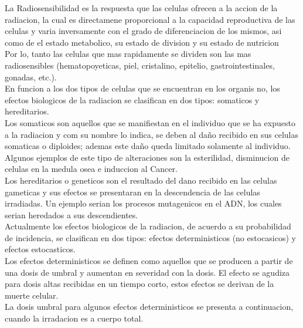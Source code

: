 \documentclass[11pt, oneside]{book}
\begin{document}
La Radiosensibilidad es la respuesta que las celulas ofrecen
a la accion de la radiacion, la cual es directamene proporcional
a la capacidad reproductiva de las celulas y varia inversamente
con el grado de diferenciacion de los mismos, asi como de el
estado metabolico, su estado de division y su estado de nutricion\\

Por lo, tanto las celulas que mas rapidamente se dividen son
las mas radiosensibles (hematopoyeticas, piel, cristalino,
epitelio, gastrointestinales, gonadas, etc.).\\

En funcion a los dos tipos de celulas que se encuentran en los
organis no, los efectos biologicos de la radiacion se clasifican
en dos tipos: somaticos y hereditarios.\\

Los somaticos son aquellos que se manifiestan en el individuo
que se ha expuesto a la radiacion y com su nombre lo indica,
se deben al daño recibido en sus celulas somaticas o diploides;
ademas este daño queda limitado solamente al individuo. Algunos
ejemplos de este tipo de alteraciones son la esterilidad,
disminucion de celulas en la medula osea e induccion al Cancer.\\

Los hereditarios o geneticos son el resultado del dano recibido
en las celulas gameticas y sus efectos se presentaran en la
descendencia de las celulas irradiadas. Un ejemplo serian los
procesos mutagenicos en el ADN, los cuales serian heredados
a sus descendientes.\\

Actualmente los efectos biologicos de la radiacion, de acuerdo
a su probabilidad de incidencia, se clasifican en dos tipos:
efectos deterministicos (no estocasicos) y efectos estocasticos.\\

Los efectos deterministicos se definen como aquellos que se
producen a partir de una dosis de umbral y aumentan en severidad con la dosis. El efecto se agudiza para dosis altas recibidas en un tiempo corto, estos efectos se derivan de la muerte celular.\\

La dosis umbral para algunos efectos deterministicos se presenta a continuacion, cuando la irradacion es a cuerpo total.\\

\end{document}
